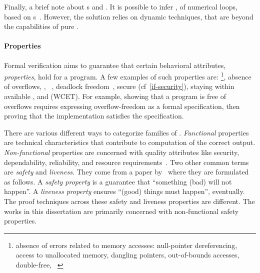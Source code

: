 Finally, a brief note about s and . It is
possible to infer , of numerical loops, based on s~\cite{nguyen2017}. However, the solution relies on dynamic
techniques, that are beyond the capabilities of pure .

\paragraph*{Properties}
Formal verification aims to guarantee that certain
behavioral attributes, \ie \emph{properties}, hold for a program. A few examples
of such properties are: \footnote{\Ie absence of errors
related to memory accesses: null-pointer dereferencing, access to unallocated
memory, dangling pointers, out-of-bounds accesses, double-free,
\etc~\cite{muller2024}}, absence of overflows, , ~\cite{georges2025}, deadlock
freedom~\cite{roscoe1987}, secure 
(cf~\autoref{if-security}), staying within available , and
 (WCET). For example, showing that a program is
free of overflows requires expressing overflow-freedom as a formal
specification, then proving that the implementation satisfies the
specification.

There are various different ways to categorize families of .
\emph{Functional} properties are technical
characteristics that contribute to computation of the correct output.
\emph{Non-functional} properties are concerned
with quality attributes like security, dependability, reliability, and resource
requirements~\cite{terbeek2018}. Two other common terms are \emph{safety} and
\emph{liveness}. They come from a paper by~\textcite{lamport1977} where they are
formulated as follows. A \emph{safety property} is a
guarantee that \enquote{something (bad) will not happen}. A \emph{liveness
property} ensures \enquote{(good) things must
happen}, eventually. The proof techniques across these safety and liveness
properties are different. The works in this dissertation are primarily concerned
with non-functional safety properties.

